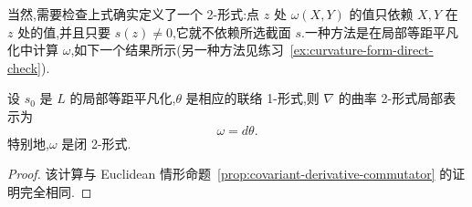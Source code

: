 当然,需要检查上式确实定义了一个 2-形式:点 $z$ 处 $\omega(X,Y)$ 的值只依赖 $X,Y$ 在 $z$ 处的值,并且只要 $s(z)\ne0$,它就不依赖所选截面 $s$.一种方法是在局部等距平凡化中计算 $\omega$,如下一个结果所示(另一种方法见练习~\ref{ex:curvature-form-direct-check}).

\begin{proposition}[局部曲率公式]
\label{prop:curvature-local-formula}
设 $s_0$ 是 $L$ 的局部等距平凡化,$\theta$ 是相应的联络 1-形式,则 $\nabla$ 的曲率 2-形式局部表示为
\[
 \omega=d\theta.
 \label{eq:curvature-local-formula}
\]
特别地,$\omega$ 是闭 2-形式.
\end{proposition}

\begin{proof}
该计算与 Euclidean 情形命题~\ref{prop:covariant-derivative-commutator} 的证明完全相同.
\end{proof}

